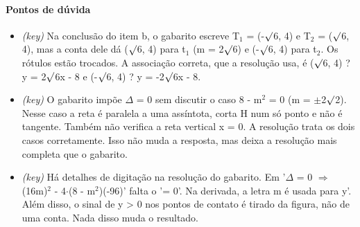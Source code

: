 \documentclass{article}%
\begin{document}
\paragraph{Pontos de dúvida}%
\begin{itemize}%
\item%
\textit{(key)} Na conclusão do item b, o gabarito escreve T$_{1}$ = (-$\surd$6, 4) e T$_{2}$ = ($\surd$6, 4), mas a conta dele dá ($\surd$6, 4) para t$_{1}$ (m = 2$\surd$6) e (-$\surd$6, 4) para t$_{2}$. Os rótulos estão trocados. A associação correta, que a resolução usa, é ($\surd$6, 4) ? y = 2$\surd$6x - 8 e (-$\surd$6, 4) ? y = -2$\surd$6x - 8.%
\item%
\textit{(key)} O gabarito impõe $\Delta$ = 0 sem discutir o caso 8 - m$^2$ = 0 (m = $\pm$2$\surd$2). Nesse caso a reta é paralela a uma assíntota, corta H num só ponto e não é tangente. Também não verifica a reta vertical x = 0. A resolução trata os dois casos corretamente. Isso não muda a resposta, mas deixa a resolução mais completa que o gabarito.%
\item%
\textit{(key)} Há detalhes de digitação na resolução do gabarito. Em '$\Delta$ = 0 $\Rightarrow$ (16m)$^2$ - 4$\cdot$(8 - m$^2$)(-96)' falta o '= 0'. Na derivada, a letra m é usada para y'. Além disso, o sinal de y > 0 nos pontos de contato é tirado da figura, não de uma conta. Nada disso muda o resultado.%
\end{itemize}%
\end{document}
